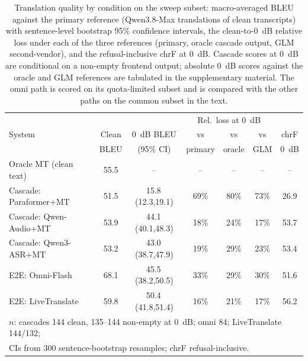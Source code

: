 \begin{table}[t]
\centering
\caption{Translation quality by condition on the sweep subset: macro-averaged
BLEU against the primary reference (Qwen3.8-Max translations of clean
transcripts) with sentence-level bootstrap 95\% confidence intervals, the
clean-to-0~dB relative loss under each of the three references (primary,
oracle cascade output, GLM second-vendor), and the refusal-inclusive chrF at
0~dB. Cascade scores at 0~dB are conditional on a non-empty frontend output;
absolute 0~dB scores against the oracle and GLM references are tabulated in
the supplementary material. The omni path is scored on its quota-limited
subset and is compared with the other paths on the common subset in the
text.}
\label{tab:translation}
\footnotesize
\setlength{\tabcolsep}{2.0pt}
\begin{tabular}{lcccccc}
\toprule
 & & & \multicolumn{3}{c}{Rel.\ loss at 0~dB} & \\
System & Clean & 0~dB BLEU & vs & vs & vs & chrF \\
 & BLEU & (95\% CI) & primary & oracle & GLM & 0~dB \\
\midrule
Oracle MT (clean text) & 55.5 & -- & -- & -- & -- & -- \\
Cascade: Paraformer+MT & 51.5 & 15.8\,(12.3,19.1) & 69\% & 80\% & 73\% & 26.9 \\
Cascade: Qwen-Audio+MT & 53.9 & 44.1\,(40.1,48.3) & 18\% & 24\% & 17\% & 53.7 \\
Cascade: Qwen3-ASR+MT & 53.2 & 43.0\,(38.7,47.9) & 19\% & 29\% & 23\% & 53.4 \\
E2E: Omni-Flash & 68.1 & 45.5\,(38.2,50.5) & 33\% & 29\% & 30\% & 51.6 \\
E2E: LiveTranslate & 59.8 & 50.4\,(41.8,51.4) & 16\% & 21\% & 17\% & 56.2 \\
\bottomrule
\multicolumn{7}{l}{\footnotesize $n$: cascades 144 clean, 135--144 non-empty at 0~dB; omni 84; LiveTranslate 144/132;}\\
\multicolumn{7}{l}{\footnotesize CIs from 300 sentence-bootstrap resamples; chrF refusal-inclusive.}
\end{tabular}
\end{table}

